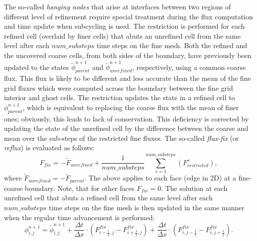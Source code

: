 The so-called \textit{hanging nodes} that arise at interfaces between two regions of different level of
refinement require special treatment during the flux computation and time update when subcycling is used.
The restriction is performed for each refined cell (overlaid by finer cells) that abuts an unrefined cell
from the same level after each $num\_substeps$ time steps on the fine mesh. Both the refined and the
uncovered coarse cells, from both sides of the boundary, have previously been updated to the states
$\tilde \phi^{n+1}_{parent}$ and $\tilde \phi^{n+1}_{unrefined}$, respectively, using a common coarse flux.
This flux is likely to be different and less accurate than the mean of the fine grid fluxes which were
computed across the boundary between the fine grid interior and ghost cells.
The restriction updates the state in a refined cell to
$\phi^{n+1}_{parent}$, which is equivalent to replacing the coarse flux with the mean of finer ones; obviously,
this leads to lack of conservation. This deficiency is corrected by updating the state of the unrefined
cell by the difference between the coarse and mean over the sub-steps of the restricted fine fluxes. The so-called
\textit{flux-fix} (or \textit{reflux}) is evaluated as follows:
\begin{equation}
\label{eq:fluxfix}
F_{fix} = - \tilde F_{unrefined}
+ \frac{1}{num\_substeps}  \sum_{s=1}^{num\_substeps} \left( F^{s}_{restricted} \right) ,
\end{equation}
where $\tilde F_{unrefined} = - \tilde F_{parent}$.
The above applies to each face (edge in 2D) at a fine-coarse boundary. Note, that for other faces $F_{fix} = 0$.
The solution at each unrefined cell that abuts a refined cell from the same level after each
$num\_substeps$ time steps on the fine mesh is then updated in the same manner when the regular time advancement is
performed:
\begin{equation}
\label{eq:apply_fluxfix}
\phi^{n+1}_{i,j}=\tilde \phi^{n+1}_{i,j}
+ \frac{\Delta t }{\Delta x } \cdot \left( F^{fix}_{i-\frac{1}{2},j} - F^{fix}_{i+\frac{1}{2},j} \right)
+ \frac{\Delta t }{\Delta x } \cdot \left( F^{fix}_{i,j-\frac{1}{2}} - F^{fix}_{i,j+\frac{1}{2}} \right).
\end{equation}

